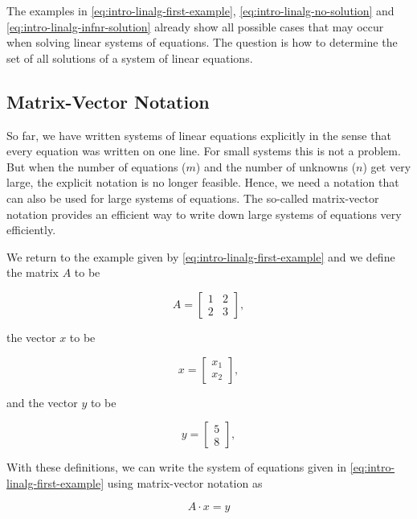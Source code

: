 \documentclass[]{book}
\theoremstyle{definition}
\theoremstyle{definition}
\theoremstyle{definition}
\theoremstyle{remark}
\begin{document}
The examples in \eqref{eq:intro-linalg-first-example}, \eqref{eq:intro-linalg-no-solution} and \eqref{eq:intro-linalg-infnr-solution} already show all possible cases that may occur when solving linear systems of equations. The question is how to determine the set of all solutions of a system of linear equations.

\hypertarget{intro-linalg-matrix-vector-notation}{%
\subsection{Matrix-Vector Notation}\label{intro-linalg-matrix-vector-notation}}

So far, we have written systems of linear equations explicitly in the sense that every equation was written on one line. For small systems this is not a problem. But when the number of equations (\(m\)) and the number of unknowns (\(n\)) get very large, the explicit notation is no longer feasible. Hence, we need a notation that can also be used for large systems of equations. The so-called matrix-vector notation provides an efficient way to write down large systems of equations very efficiently.

We return to the example given by \eqref{eq:intro-linalg-first-example} and we define the matrix \(A\) to be

\[
A = \left[
\begin{array}{cc}
1  &  2 \\
2  &  3
\end{array}
\right], 
\]

the vector \(x\) to be

\[
x = \left[
\begin{array}{c}
x_1  \\
x_2  
\end{array}
\right], 
\]

and the vector \(y\) to be

\[
y = \left[
\begin{array}{c}
5  \\
8  
\end{array}
\right], 
\]

With these definitions, we can write the system of equations given in \eqref{eq:intro-linalg-first-example} using matrix-vector notation as

\begin{equation}
A \cdot x = y
\label{eq:intro-linalg-matrix-vector-notation}
\end{equation}
\end{document}
